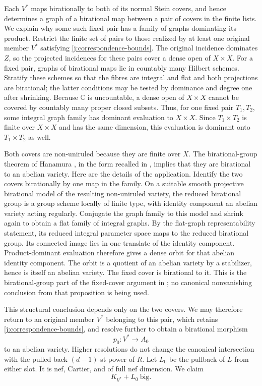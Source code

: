 \documentclass[12pt,a4paper,psamsfonts]{amsart}
\theoremstyle{definition}
\theoremstyle{plain}
\newcommand{\C}{\mathbb C}
\begin{document}
Each $V^*$ maps birationally to both of its normal Stein covers,
and hence determines a graph of a birational map between a pair
of covers in the finite lists. We explain why some such fixed pair
has a family of graphs dominating its product. Restrict the finite
set of pairs to those realized by at least one original member
$V^*$ satisfying \eqref{j:correspondence-bounds}. The original
incidence dominates $Z$, so the projected incidences for these
pairs cover a dense open of $X\times X$. For a fixed pair, graphs of
birational maps lie in countably many Hilbert schemes. Stratify
these schemes so that the fibres are integral and flat and both
projections are birational; the latter conditions may be tested
by dominance and degree one after shrinking. Because $\C$ is
uncountable, a dense open of $X\times X$ cannot be covered by
countably many proper closed subsets. Thus, for one fixed pair
$T_1,T_2$, some integral graph family has dominant evaluation to
$X\times X$. Since $T_1\times T_2$ is finite over $X\times X$
and has the same dimension, this evaluation is dominant onto
$T_1\times T_2$ as well.

Both covers are non-uniruled because they are finite over $X$.
The birational-group theorem of Hanamura
\cite[Theorems~2.1--2.2]{Hanamura}, in the form recalled in
\cite[Proposition~3.7 and Theorems~3.8--3.9]{Blanc}, implies that
they are birational to an abelian variety. Here are the details
of the application. Identify the two covers birationally by one
map in the family. On a suitable smooth projective birational
model of the resulting non-uniruled variety, the reduced
birational group is a group scheme locally of finite type, with
identity component an abelian variety acting regularly. Conjugate
the graph family to this model and shrink again to obtain a flat
family of integral graphs. By the flat-graph representability
statement, its reduced integral parameter space maps to the
reduced birational group. Its connected image lies in one
translate of the identity component. Product-dominant evaluation
therefore gives a dense orbit for that abelian identity component.
The orbit is a quotient of an abelian variety by a stabilizer,
hence is itself an abelian variety. The fixed cover is birational
to it. This is the birational-group part of the fixed-cover
argument in \cite[Proposition~6.11]{LA}; no canonical
nonvanishing conclusion from that proposition is being used.

This structural conclusion depends only on the two covers. We may
therefore return to an original member $V^*$ belonging to this pair,
which retains \eqref{j:correspondence-bounds}, and resolve
further to obtain a birational morphism
\[
                         p_0:V^*\longrightarrow A_0
\]
to an abelian variety. Higher resolutions do not change the
canonical intersection with the pulled-back $(d-1)$-st power of
$R$. Let $L_0$ be the pullback of $L$ from either slot. It is nef,
Cartier, and of full nef dimension. We claim
\begin{equation}\label{j:abelian-big}
                         K_{V^*}+L_0\ \text{big}.
\end{equation}
\end{document}
